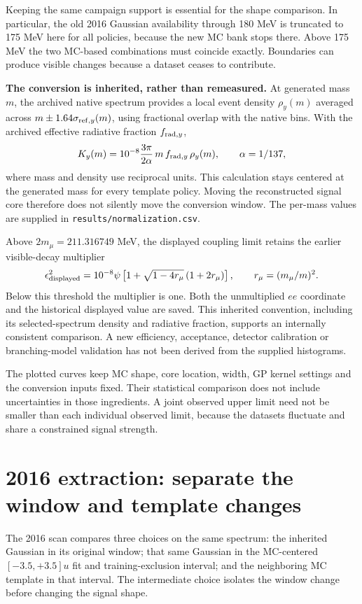 \documentclass[11pt]{article}
\begin{document}
Keeping the same campaign support is essential for the shape comparison. In particular, the old 2016 Gaussian availability through 180 MeV is truncated to 175 MeV here for all policies, because the new MC bank stops there. Above 175 MeV the two MC-based combinations must coincide exactly. Boundaries can produce visible changes because a dataset ceases to contribute.

\textbf{The conversion is inherited, rather than remeasured.} At generated mass $m$, the archived native spectrum provides a local event density $\rho_y(m)$ averaged across $m\pm1.64\sigma_{{\rm ref},y}(m)$, using fractional overlap with the native bins. With the archived effective radiative fraction $f_{{\rm rad},y}$,
\[
 K_y(m)=10^{-8}\frac{3\pi}{2\alpha}\,m\,f_{{\rm rad},y}\,\rho_y(m),\qquad \alpha=1/137,
\]
where mass and density use reciprocal units. This calculation stays centered at the generated mass for every template policy. Moving the reconstructed signal core therefore does not silently move the conversion window. The per-mass values are supplied in \texttt{results/normalization.csv}.

Above $2m_\mu=211.316749$ MeV, the displayed coupling limit retains the earlier visible-decay multiplier
\[
 \epsilon^2_{\rm displayed}=10^{-8}\psi\left[1+\sqrt{1-4r_\mu}\,(1+2r_\mu)\right],
 \qquad r_\mu=(m_\mu/m)^2.
\]
Below this threshold the multiplier is one. Both the unmultiplied $ee$ coordinate and the historical displayed value are saved. This inherited convention, including its selected-spectrum density and radiative fraction, supports an internally consistent comparison. A new efficiency, acceptance, detector calibration or branching-model validation has not been derived from the supplied histograms.

The plotted curves keep MC shape, core location, width, GP kernel settings and the conversion inputs fixed. Their statistical comparison does not include uncertainties in those ingredients. A joint observed upper limit need not be smaller than each individual observed limit, because the datasets fluctuate and share a constrained signal strength.
\clearpage\section*{2016 extraction: separate the window and template changes}

The 2016 scan compares three choices on the same spectrum: the inherited Gaussian in its original window; that same Gaussian in the MC-centered $[-3.5,+3.5]u$ fit and training-exclusion interval; and the neighboring MC template in that interval. The intermediate choice isolates the window change before changing the signal shape.
\end{document}
